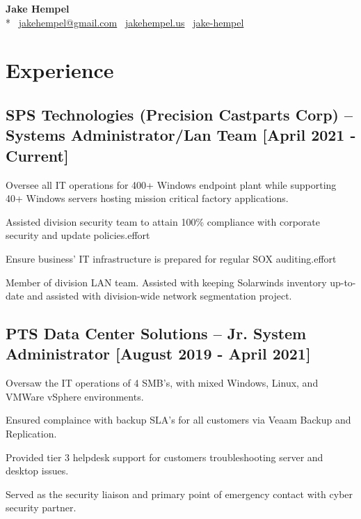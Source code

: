 \documentclass{article}
\begin{document}
\begin{samepage}
\begin{center}
\huge{\textbf{Jake Hempel}} \\*
\large{\faEnvelope \, \href{mailto:jakehempel@gmail.com}{jakehempel@gmail.com}
\faGlobe \, \href{https://jakehempel.us}{jakehempel.us}}
\faLinkedinSquare \, \href{https://www.linkedin.com/in/jake-hempel/}{jake-hempel}
\end{center}

\section{Experience}
\subsection{SPS Technologies (Precision Castparts Corp) -- Systems Administrator/Lan Team [April 2021 - Current]}
\begin{compactitem}
	\item Oversee all IT operations for 400+ Windows endpoint plant while supporting 40+ Windows servers hosting mission critical factory applications.
	\item Assisted division security team to attain 100\% compliance with corporate security and update policies.effort
	\item Ensure business' IT infrastructure is prepared for regular SOX auditing.effort
	\item Member of division LAN team. Assisted with keeping Solarwinds inventory up-to-date and assisted with division-wide network segmentation project.
\end{compactitem}
\subsection{PTS Data Center Solutions -- Jr. System Administrator [August 2019 - April 2021]}
\begin{compactitem}
	\item Oversaw the IT operations of 4 SMB's, with mixed Windows, Linux, and VMWare vSphere environments.
	\item Ensured complaince with backup SLA's for all customers via Veaam Backup and Replication.
	\item Provided tier 3 helpdesk support for customers troubleshooting server and desktop issues.
 	\item Served as the security liaison and primary point of emergency contact with cyber security partner.
\end{compactitem}

\end{samepage}
\end{document}
